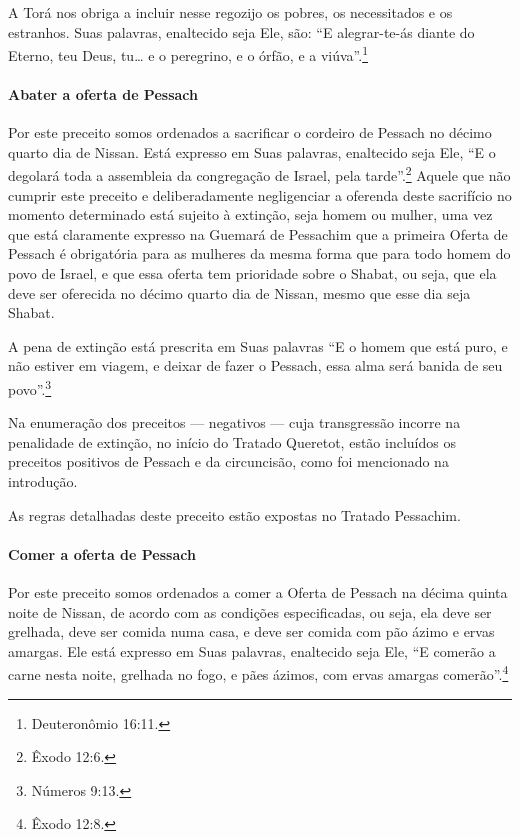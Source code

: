 A Torá nos obriga a incluir nesse regozijo os pobres, os necessitados
e os estranhos. Suas palavras, enaltecido seja Ele, são: ``E
alegrar-te-ás diante do Eterno, teu Deus, tu\ldots{} e o peregrino, e o
órfão, e a viúva''.\footnote{Deuteronômio 16:11.}

\paragraph{Abater a oferta de Pessach}

Por este preceito somos ordenados a sacrificar o cordeiro de Pessach
no décimo quarto dia de Nissan. Está expresso em Suas palavras,
enaltecido seja Ele, ``E o degolará toda a assembleia da congregação de
Israel, pela tarde''.\footnote{Êxodo 12:6.} Aquele que não cumprir este preceito
e deliberadamente negligenciar a oferenda deste sacrifício no momento
determinado está sujeito à extinção, seja homem ou mulher, uma vez que
está claramente expresso na Guemará de Pessachim que a primeira Oferta
de Pessach é obrigatória para as mulheres da mesma forma que para
todo homem do povo de Israel, e que essa oferta tem prioridade sobre o
Shabat, ou seja, que ela deve ser oferecida no décimo quarto dia de
Nissan, mesmo que esse dia seja Shabat.

A pena de extinção está prescrita em Suas palavras ``E o homem que está
puro, e não estiver em viagem, e deixar de fazer o Pessach, essa alma
será banida de seu povo''.\footnote{Números 9:13.}

Na enumeração dos preceitos --- negativos --- cuja transgressão incorre
na penalidade de extinção, no início do Tratado Queretot, estão
incluídos os preceitos positivos de Pessach e da circuncisão, como
foi mencionado na introdução.

As regras detalhadas deste preceito estão expostas no Tratado Pessachim.

\paragraph{Comer a oferta de Pessach}

Por este preceito somos ordenados a comer a Oferta de Pessach na
décima quinta noite de Nissan, de acordo com as condições especificadas,
ou seja, ela deve ser grelhada, deve ser comida numa casa, e deve ser
comida com pão ázimo e ervas amargas. Ele está expresso em Suas
palavras, enaltecido seja Ele, ``E comerão a carne nesta noite, grelhada
no fogo, e pães ázimos, com ervas amargas comerão''.\footnote{Êxodo 12:8.}

